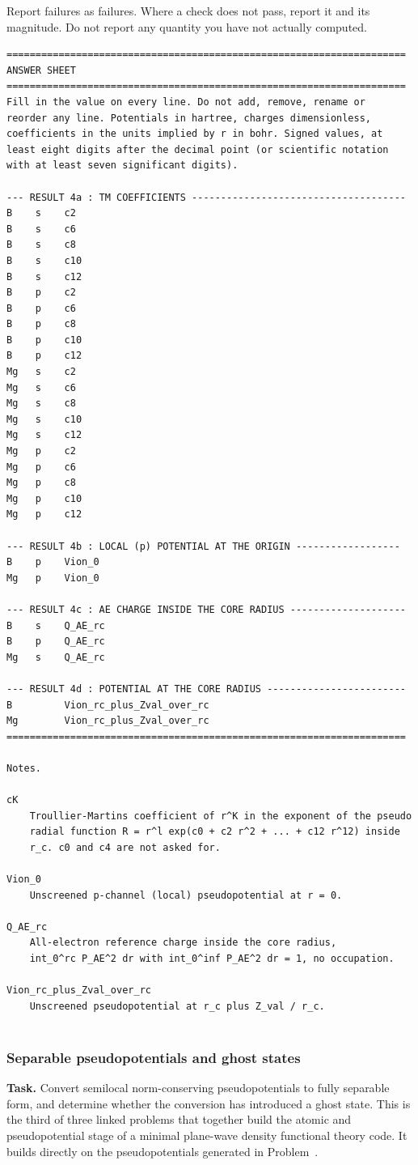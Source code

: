 Report failures as failures. Where a check does not pass, report it and its magnitude. Do not report any
quantity you have not actually computed.
\begin{lstlisting}
=====================================================================
ANSWER SHEET
=====================================================================
Fill in the value on every line. Do not add, remove, rename or
reorder any line. Potentials in hartree, charges dimensionless,
coefficients in the units implied by r in bohr. Signed values, at
least eight digits after the decimal point (or scientific notation
with at least seven significant digits).

--- RESULT 4a : TM COEFFICIENTS -------------------------------------
B    s    c2
B    s    c6
B    s    c8
B    s    c10
B    s    c12
B    p    c2
B    p    c6
B    p    c8
B    p    c10
B    p    c12
Mg   s    c2
Mg   s    c6
Mg   s    c8
Mg   s    c10
Mg   s    c12
Mg   p    c2
Mg   p    c6
Mg   p    c8
Mg   p    c10
Mg   p    c12

--- RESULT 4b : LOCAL (p) POTENTIAL AT THE ORIGIN ------------------
B    p    Vion_0
Mg   p    Vion_0

--- RESULT 4c : AE CHARGE INSIDE THE CORE RADIUS --------------------
B    s    Q_AE_rc
B    p    Q_AE_rc
Mg   s    Q_AE_rc

--- RESULT 4d : POTENTIAL AT THE CORE RADIUS ------------------------
B         Vion_rc_plus_Zval_over_rc
Mg        Vion_rc_plus_Zval_over_rc
=====================================================================

Notes.

cK
    Troullier-Martins coefficient of r^K in the exponent of the pseudo
    radial function R = r^l exp(c0 + c2 r^2 + ... + c12 r^12) inside
    r_c. c0 and c4 are not asked for.

Vion_0
    Unscreened p-channel (local) pseudopotential at r = 0.

Q_AE_rc
    All-electron reference charge inside the core radius,
    int_0^rc P_AE^2 dr with int_0^inf P_AE^2 dr = 1, no occupation.

Vion_rc_plus_Zval_over_rc
    Unscreened pseudopotential at r_c plus Z_val / r_c.
    
\end{lstlisting}

\subsubsection{Separable pseudopotentials and ghost states}
\label{problem:separable-pseudopotential-ghosts}
\textbf{Task.} Convert semilocal norm-conserving pseudopotentials to fully separable form, and determine
whether the conversion has introduced a ghost state. This is the third of three linked problems that together
build the atomic and pseudopotential stage of a minimal plane-wave density functional theory code. It builds
directly on the pseudopotentials generated in Problem~.


